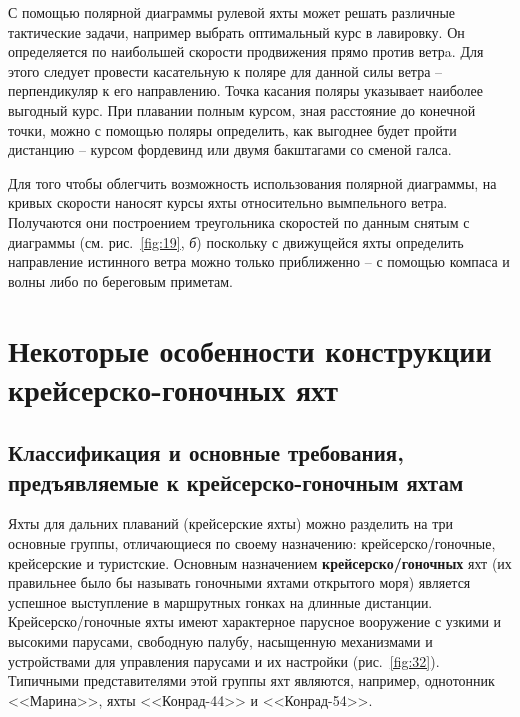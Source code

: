 \documentclass[a4paper, 12pt, twoside, final, book, russian, fittopage, cyremdash]{ncc}
\newcommand{\ris}[1]{\ref{fig:#1}}
\begin{document}
С помощью полярной диаграммы рулевой яхты может решать различные тактические задачи, например выбрать оптимальный курс в лавировку. Он определяется по наибольшей скорости продвижения прямо против ветрa. Для этого следует провести касательную к поляре для данной силы ветра \--- перпендикуляр к его направлению. Точка касания поляры указывает наиболее выгодный курс. При плавании полным курсом, зная расстояние до конечной точки, можно с помощью поляры определить, как выгоднее будет пройти дистанцию \--- курсом фордевинд или двумя бакштагами со сменой галса.

Для того чтобы облегчить возможность использования полярной диаграммы, на кривых скорости наносят курсы яхты относительно вымпельного ветра. Получаются они построением треугольника скоростей по данным снятым с диаграммы (см. рис.~\ris{19}, \textit{б}) поскольку с движущейся яхты определить направление истинного ветра можно только приближенно \--- с помощью компаса и волны либо по береговым приметам.

\chapter{Некоторые особенности конструкции крейсерско-гоночных яхт}

\section{Классификация и основные требования, предъявляемые к крейсерско-гоночным яхтам}

Яхты для дальних плаваний (крейсерские яхты) можно разделить на три основные группы, отличающиеся по своему назначению: крейсерско\-/гоночные, крейсерские и туристские. 
Основным назначением \textbf{крейсерско\-/гоночных} яхт (их правильнее было бы называть гоночными яхтами открытого моря) является успешное выступление в маршрутных гонках на длинные дистанции. Крейсерско\-/гоночные яхты имеют характерное парусное вооружение с узкими и высокими парусами, свободную палубу, насыщенную механизмами и устройствами для управления парусами и их настройки (рис.~\ris{32}). Типичными представителями этой группы яхт являются, например, однотонник <<Марина>>, яхты <<Конрад-44>> и <<Конрад-54>>.
\end{document}
